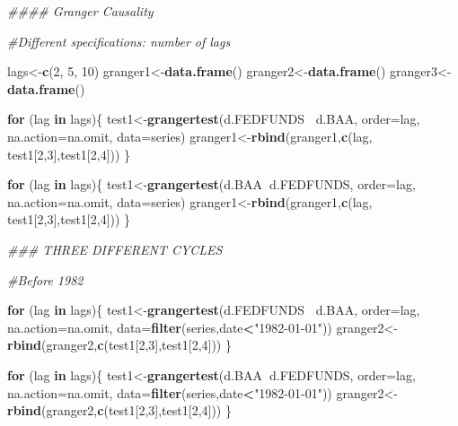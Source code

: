 \documentclass[
]{article}
\newenvironment{Shaded}{\begin{snugshade}}{\end{snugshade}}
\newcommand{\CommentTok}[1]{\textcolor[rgb]{0.56,0.35,0.01}{\textit{#1}}}
\newcommand{\ControlFlowTok}[1]{\textcolor[rgb]{0.13,0.29,0.53}{\textbf{#1}}}
\newcommand{\DataTypeTok}[1]{\textcolor[rgb]{0.13,0.29,0.53}{#1}}
\newcommand{\DecValTok}[1]{\textcolor[rgb]{0.00,0.00,0.81}{#1}}
\newcommand{\KeywordTok}[1]{\textcolor[rgb]{0.13,0.29,0.53}{\textbf{#1}}}
\newcommand{\NormalTok}[1]{#1}
\newcommand{\OperatorTok}[1]{\textcolor[rgb]{0.81,0.36,0.00}{\textbf{#1}}}
\newcommand{\StringTok}[1]{\textcolor[rgb]{0.31,0.60,0.02}{#1}}
\begin{document}
\begin{Shaded}
\begin{Highlighting}[]
{{\CommentTok{#### Granger Causality}


\CommentTok{#Different specifications: number of lags}

\NormalTok{lags<-}\KeywordTok{c}\NormalTok{(}\DecValTok{2}\NormalTok{, }\DecValTok{5}\NormalTok{, }\DecValTok{10}\NormalTok{)}
\NormalTok{granger1<-}\KeywordTok{data.frame}\NormalTok{()}
\NormalTok{granger2<-}\KeywordTok{data.frame}\NormalTok{()}
\NormalTok{granger3<-}\KeywordTok{data.frame}\NormalTok{()}

\ControlFlowTok{for}\NormalTok{ (lag }\ControlFlowTok{in}\NormalTok{ lags)\{}
\NormalTok{test1<-}\KeywordTok{grangertest}\NormalTok{(d.FEDFUNDS }\OperatorTok{~}\NormalTok{d.BAA, }
                   \DataTypeTok{order=}\NormalTok{lag, }\DataTypeTok{na.action=}\NormalTok{na.omit, }\DataTypeTok{data=}\NormalTok{series)}
\NormalTok{granger1<-}\KeywordTok{rbind}\NormalTok{(granger1,}\KeywordTok{c}\NormalTok{(lag, test1[}\DecValTok{2}\NormalTok{,}\DecValTok{3}\NormalTok{],test1[}\DecValTok{2}\NormalTok{,}\DecValTok{4}\NormalTok{]))}
\NormalTok{\}}

\ControlFlowTok{for}\NormalTok{ (lag }\ControlFlowTok{in}\NormalTok{ lags)\{}
\NormalTok{  test1<-}\KeywordTok{grangertest}\NormalTok{(d.BAA}\OperatorTok{~}\NormalTok{d.FEDFUNDS, }
                     \DataTypeTok{order=}\NormalTok{lag, }\DataTypeTok{na.action=}\NormalTok{na.omit, }\DataTypeTok{data=}\NormalTok{series)}
\NormalTok{  granger1<-}\KeywordTok{rbind}\NormalTok{(granger1,}\KeywordTok{c}\NormalTok{(lag, test1[}\DecValTok{2}\NormalTok{,}\DecValTok{3}\NormalTok{],test1[}\DecValTok{2}\NormalTok{,}\DecValTok{4}\NormalTok{]))}
\NormalTok{\}}

\CommentTok{### THREE DIFFERENT CYCLES}

\CommentTok{#Before 1982}

\ControlFlowTok{for}\NormalTok{ (lag }\ControlFlowTok{in}\NormalTok{ lags)\{}
\NormalTok{  test1<-}\KeywordTok{grangertest}\NormalTok{(d.FEDFUNDS }\OperatorTok{~}\NormalTok{d.BAA, }\DataTypeTok{order=}\NormalTok{lag,}
                     \DataTypeTok{na.action=}\NormalTok{na.omit, }\DataTypeTok{data=}\KeywordTok{filter}\NormalTok{(series,date}\OperatorTok{<}\StringTok{"1982-01-01"}\NormalTok{))}
\NormalTok{  granger2<-}\KeywordTok{rbind}\NormalTok{(granger2,}\KeywordTok{c}\NormalTok{(test1[}\DecValTok{2}\NormalTok{,}\DecValTok{3}\NormalTok{],test1[}\DecValTok{2}\NormalTok{,}\DecValTok{4}\NormalTok{]))}
\NormalTok{\}}

\ControlFlowTok{for}\NormalTok{ (lag }\ControlFlowTok{in}\NormalTok{ lags)\{}
\NormalTok{  test1<-}\KeywordTok{grangertest}\NormalTok{(d.BAA}\OperatorTok{~}\NormalTok{d.FEDFUNDS, }\DataTypeTok{order=}\NormalTok{lag,}
                     \DataTypeTok{na.action=}\NormalTok{na.omit, }\DataTypeTok{data=}\KeywordTok{filter}\NormalTok{(series,date}\OperatorTok{<}\StringTok{"1982-01-01"}\NormalTok{))}
\NormalTok{  granger2<-}\KeywordTok{rbind}\NormalTok{(granger2,}\KeywordTok{c}\NormalTok{(test1[}\DecValTok{2}\NormalTok{,}\DecValTok{3}\NormalTok{],test1[}\DecValTok{2}\NormalTok{,}\DecValTok{4}\NormalTok{]))}
\NormalTok{\}}


}}
\end{Highlighting}
\end{Shaded}
\end{document}
